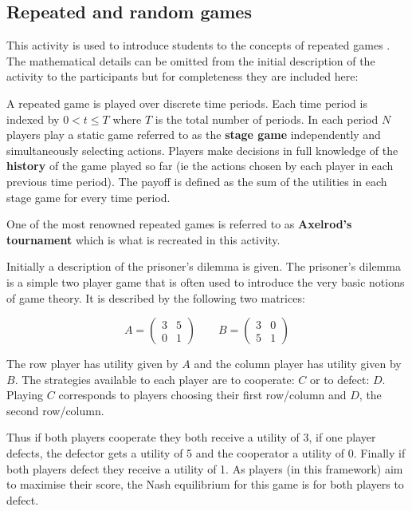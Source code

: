 \documentclass[12pt, a4paper]{article}
\begin{document}
\subsection{Repeated and random games}\label{sec:repeated_games}

This activity is used to introduce students to the concepts of repeated games
\cite{Maschler2013}. The mathematical details can be omitted from the initial
description of the activity to the participants but for completeness they are
included here:

A repeated game is played over discrete time periods. Each time period is
indexed by \(0<t\leq T\) where \(T\) is the total number of periods.  In each
period \(N\) players play a static game referred to as the \textbf{stage game}
independently and simultaneously selecting actions.  Players make decisions in
full knowledge of the \textbf{history} of the game played so far (ie the actions
chosen by each player in each previous time period).  The payoff is defined
as the sum of the utilities in each stage game for every time period.

One of the most renowned repeated games is referred to as \textbf{Axelrod's
tournament} \cite{Axelrod1980a, Axelrod1980b} which is what is recreated in this
activity.

Initially a description of the prisoner's dilemma \cite{Maschler2013} is given.
The prisoner's dilemma is a simple two player game that is often used to
introduce the very basic notions of game theory. It is described by the
following two matrices:

\[
    A =
    \begin{pmatrix}
        3&5\\
        0&1
    \end{pmatrix}
    \qquad
    B =
    \begin{pmatrix}
        3&0\\
        5&1
    \end{pmatrix}
\]

The row player has utility given by \(A\) and the column player has utility
given by \(B\).
The strategies available to each player are to cooperate: \(C\) or to defect:
\(D\). Playing \(C\) corresponds to players choosing their first row/column and
\(D\), the second row/column.

Thus if both players cooperate they both receive a utility of 3, if one player
defects, the defector gets a utility of 5 and the cooperator a utility of 0.
Finally if both players defect they receive a utility of 1. As players (in this
framework) aim to maximise their score, the Nash equilibrium for this game is
for both players to defect.
\end{document}
